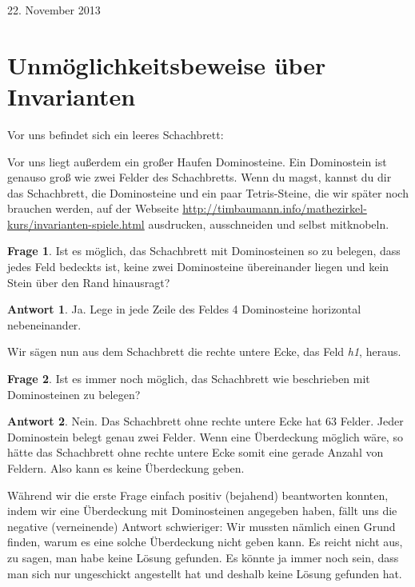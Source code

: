 \documentclass[a4paper,ngerman,12pt]{scrartcl}
\newcommand{\datum}[1]{\hfill {#1}\\}
\theoremstyle{definition}
\newtheorem*{frage}{Frage}
\newtheorem*{antw}{Antwort}
\begin{document}
\datum{22. November 2013}

\section{Unmöglichkeitsbeweise über Invarianten}


Vor uns befindet sich ein leeres Schachbrett:

\begin{center}
  \newgame
  \showboard
\end{center}

Vor uns liegt außerdem ein großer Haufen Dominosteine. Ein Dominostein ist genauso groß wie zwei Felder des Schachbretts. Wenn du magst, kannst du dir das Schachbrett, die Dominosteine und ein paar Tetris-Steine, die wir später noch brauchen werden, auf der Webseite \mbox{\url{http://timbaumann.info/mathezirkel-kurs/invarianten-spiele.html}} ausdrucken, ausschneiden und selbst mitknobeln.

\begin{frage}
  Ist es möglich, das Schachbrett mit Dominosteinen so zu belegen, dass jedes Feld bedeckts ist, keine zwei Dominosteine übereinander liegen und kein Stein über den Rand hinausragt? 
\end{frage}

\begin{antw}
  Ja. Lege in jede Zeile des Feldes 4 Dominosteine horizontal nebeneinander.
\end{antw}

Wir sägen nun aus dem Schachbrett die rechte untere Ecke, das Feld \emph{h1}, heraus.

\begin{frage}
  Ist es immer noch möglich, das Schachbrett wie beschrieben mit Dominosteinen zu belegen?
\end{frage}

\begin{antw}
  Nein. Das Schachbrett ohne rechte untere Ecke hat 63 Felder. Jeder Dominostein belegt genau zwei Felder. Wenn eine Überdeckung möglich wäre, so hätte das Schachbrett ohne rechte untere Ecke somit eine gerade Anzahl von Feldern. Also kann es keine Überdeckung geben.
\end{antw}

Während wir die erste Frage einfach positiv (bejahend) beantworten konnten, indem wir eine Überdeckung mit Dominosteinen angegeben haben, fällt uns die negative (verneinende) Antwort schwieriger: Wir mussten nämlich einen Grund finden, warum es eine solche Überdeckung nicht geben kann. Es reicht nicht aus, zu sagen, man habe keine Lösung gefunden. Es könnte ja immer noch sein, dass man sich nur ungeschickt angestellt hat und deshalb keine Lösung gefunden hat.
\end{document}
